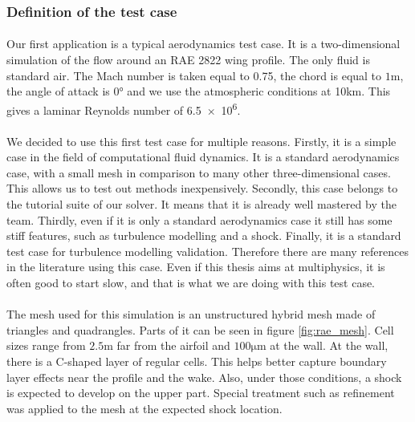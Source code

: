       \subsubsection{Definition of the test case}

        \paragraph{}
        Our first application is a typical aerodynamics test case.
        It is a two-dimensional simulation of the flow around an RAE 2822 wing profile.
        The only fluid is standard air.
        The Mach number is taken equal to 0.75, the chord is equal to $1\si{\meter}$, the angle of attack is $0\si{\degree}$ and we use the atmospheric conditions at 10km.
        This gives a laminar Reynolds number of \num{6.5e6}.

        \paragraph{}
        We decided to use this first test case for multiple reasons.
        Firstly, it is a simple case in the field of computational fluid dynamics.
        It is a standard aerodynamics case, with a small mesh in comparison to many other three-dimensional cases.
        This allows us to test out methods inexpensively.
        Secondly, this case belongs to the tutorial suite of our solver.
        It means that it is already well mastered by the team.
        Thirdly, even if it is only a standard aerodynamics case it still has some stiff features, such as turbulence modelling and a shock.
        Finally, it is a standard test case for turbulence modelling validation.
        Therefore there are many references in the literature using this case.
        Even if this thesis aims at multiphysics, it is often good to start slow, and that is what we are doing with this test case.

        \paragraph{}
        The mesh used for this simulation is an unstructured hybrid mesh made of triangles and quadrangles.
        Parts of it can be seen in figure \ref{fig:rae_mesh}.
        Cell sizes range from $2.5\si{\meter}$ far from the airfoil and $100\si{\micro\meter}$ at the wall.
        At the wall, there is a C-shaped layer of regular cells.
        This helps better capture boundary layer effects near the profile and the wake.
        Also, under those conditions, a shock is expected to develop on the upper part.
        Special treatment such as refinement was applied to the mesh at the expected shock location.

